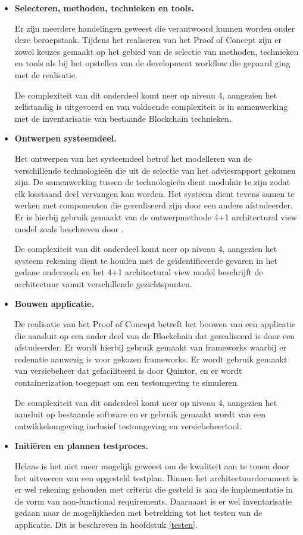 \begin{itemize}
  \item \textbf{Selecteren, methoden, technieken en tools.}
  
  Er zijn meerdere handelingen geweest die verantwoord kunnen worden onder deze beroepstaak. Tijdens het realiseren van het Proof of Concept zijn er zowel keuzes gemaakt op het gebied van de selectie van methoden, technieken en tools als bij het opstellen van de development workflow die gepaard ging met de realisatie. 
  
  De complexiteit van dit onderdeel komt neer op niveau 4, aangezien het zelfstandig is uitgevoerd en van voldoende complexiteit is in samenwerking met de inventarisatie van bestaande Blockchain technieken.

  \clearpage
  \item \textbf{Ontwerpen systeemdeel.}
  
  Het ontwerpen van het systeemdeel betrof het modelleren van de verschillende technologieën die uit de selectie van het adviesrapport gekomen zijn. De samenwerking tussen de technologieën dient modulair te zijn zodat elk losstaand deel vervangen kan worden. Het systeem dient tevens samen te werken met componenten die gerealiseerd zijn door een andere afstudeerder. Er is hierbij gebruik gemaakt van de ontwerpmethode 4+1 architectural view model zoals beschreven door \cite{kruchten19954+}. 
  
  De complexiteit van dit onderdeel komt neer op niveau 4, aangezien het systeem rekening dient te houden met de geïdentificeerde gevaren in het gedane onderzoek en het 4+1 architectural view model beschrijft de architectuur vanuit verschillende gezichtspunten.

  \item \textbf{Bouwen applicatie.}

  De realisatie van het Proof of Concept betreft het bouwen van een applicatie die aansluit op een ander deel van de Blockchain dat gerealiseerd is door een afstudeerder. Er wordt hierbij gebruik gemaakt van frameworks waarbij er redenatie aanwezig is voor gekozen frameworks. Er wordt gebruik gemaakt van versiebeheer dat gefaciliteerd is door Quintor, en er wordt containerization toegepast om een testomgeving te simuleren.

  De complexiteit van dit onderdeel komt neer op niveau 4, aangezien het aansluit op bestaande software en er gebruik gemaakt wordt van een ontwikkelomgeving inclusief testomgeving en versiebeheertool.

  \item \textbf{Initiëren en plannen testproces.}

  Helaas is het niet meer mogelijk geweest om de kwaliteit aan te tonen door het uitvoeren van een opgesteld testplan. Binnen het architectuurdocument is er wel rekening gehouden met criteria die gesteld is aan de implementatie in de vorm van non-functional requirements. Daarnaast is er wel inventarisatie gedaan naar de mogelijkheden met betrekking tot het testen van de applicatie. Dit is beschreven in hoofdstuk \ref{testen}.
\end{itemize}

